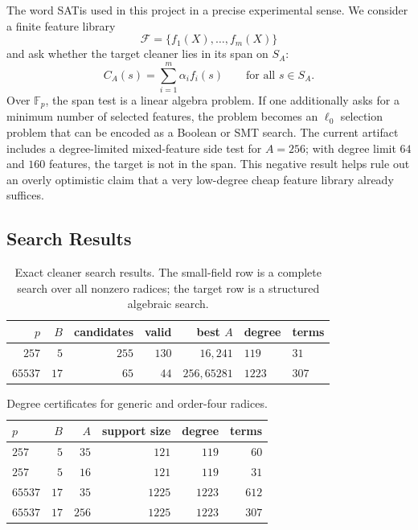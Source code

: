\documentclass[a4paper,runningheads]{llncs}
\newcommand{\Fp}{\mathbb{F}_p}
\newcommand{\Sat}{\textsf{SAT}}
\begin{document}
The word \Sat is used in this project in a precise experimental sense.  We
consider a finite feature library
\[
  \mathcal{F}=\{f_1(X),\ldots,f_m(X)\}
\]
and ask whether the target cleaner lies in its span on $S_A$:
\[
  C_A(s)=\sum_{i=1}^m \alpha_i f_i(s)
  \qquad\text{for all }s\in S_A.
\]
Over $\Fp$, the span test is a linear algebra problem.  If one additionally
asks for a minimum number of selected features, the problem becomes an
$\ell_0$ selection problem that can be encoded as a Boolean or SMT search.
The current artifact includes a degree-limited mixed-feature side test for
$A=256$; with degree limit $64$ and $160$ features, the target is not in the
span.  This negative result helps rule out an overly optimistic claim that a
very low-degree cheap feature library already suffices.

\subsection{Search Results}

\begin{table}[t]
\centering
\caption{Exact cleaner search results.  The small-field row is a complete
search over all nonzero radices; the target row is a structured algebraic
search.}
\label{tab:search_results}
\begin{tabular}{rrrrrll}
\toprule
$p$ & $B$ & candidates & valid & best $A$ & degree & terms \\
\midrule
$257$ & $5$ & $255$ & $130$ & $16,241$ & $119$ & $31$ \\
$65537$ & $17$ & $65$ & $44$ & $256,65281$ & $1223$ & $307$ \\
\bottomrule
\end{tabular}
\end{table}

\begin{table}[t]
\centering
\caption{Degree certificates for generic and order-four radices.}
\label{tab:degree_certificates}
\begin{tabular}{lrrrrr}
\toprule
$p$ & $B$ & $A$ & support size & degree & terms \\
\midrule
$257$ & $5$ & $35$ & $121$ & $119$ & $60$ \\
$257$ & $5$ & $16$ & $121$ & $119$ & $31$ \\
$65537$ & $17$ & $35$ & $1225$ & $1223$ & $612$ \\
$65537$ & $17$ & $256$ & $1225$ & $1223$ & $307$ \\
\bottomrule
\end{tabular}
\end{table}
\end{document}
